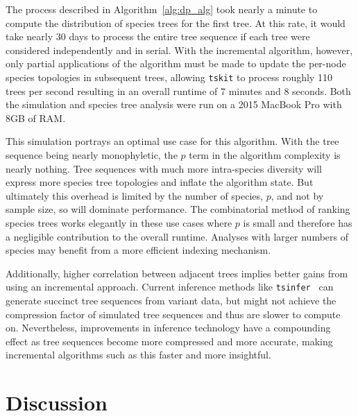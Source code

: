 \documentclass{article}
\newcommand{\tskit}{{\texttt{tskit}}}
\newcommand{\tsinfer}{{\texttt{tsinfer}}}
\begin{document}
The process described in Algorithm~\ref{alg:dp_alg}
took nearly a minute to compute the distribution of species trees for the first tree.
At this rate, it would take nearly 30 days to process the entire tree sequence if
each tree were considered independently and in serial.
With the incremental algorithm, however, only partial applications of the algorithm
must be made to update the per-node species topologies in subsequent trees, allowing
\tskit{} to process roughly 110 trees per second resulting in an overall
runtime of 7 minutes and 8 seconds. Both the simulation and species tree analysis
were run on a 2015 MacBook Pro with 8GB of RAM.

This simulation portrays an optimal use case for this algorithm. With the tree
sequence being nearly monophyletic, the $p$ term in the algorithm complexity is
nearly nothing. Tree sequences with much more intra-species diversity will express
more species tree topologies and inflate the algorithm state. But ultimately this
overhead is limited by the number of species, $p$, and not by sample size, so will
dominate performance. The combinatorial method of ranking
species trees works elegantly in these use cases where $p$ is small and therefore has
a negligible contribution to the overall runtime. Analyses with larger numbers of
species may benefit from a more efficient indexing mechanism.

Additionally, higher correlation between adjacent trees implies
better gains from using an incremental approach. Current inference methods
like \tsinfer{}~\citep{tsinfer} can generate succinct tree sequences from variant data,
but might not achieve the compression factor of simulated tree sequences and thus
are slower to compute on. Nevertheless, improvements in inference technology have
a compounding effect as tree sequences become more compressed and more accurate,
making incremental algorithms such as this faster and more insightful.

\section{Discussion}




\end{document}

